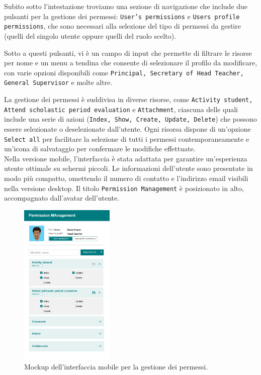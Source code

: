 \documentclass[a4paper, 12pt]{book}
\begin{document}
Subito sotto l'intestazione troviamo una sezione di navigazione che include due pulsanti per la
gestione dei permessi: \texttt{User's permissions} e \texttt{Users profile permissions},
che sono necessari alla selezione del tipo di permessi da gestire (quelli del singolo utente oppure
quelli del ruolo scelto).

Sotto a questi pulsanti, vi è un campo di input che permette di filtrare le risorse per nome e un menu a
tendina che consente di selezionare il profilo da modificare, con varie opzioni disponibili come \texttt{Principal,
  Secretary of Head Teacher, General Supervisor} e molte altre.

La gestione dei permessi è suddivisa in diverse risorse, come \texttt{Activity student, Attend scholastic period evaluation}
e \texttt{Attachment}, ciascuna delle quali include una serie di azioni (\texttt{Index, Show, Create, Update, Delete})
che possono essere selezionate o deselezionate dall'utente. Ogni risorsa dispone di un'opzione
\texttt{Select all} per facilitare la selezione di tutti i permessi contemporaneamente e un'icona di salvataggio
per confermare le modifiche effettuate.\\

Nella versione mobile, l'interfaccia è stata adattata per garantire un'esperienza utente ottimale su
schermi piccoli. Le informazioni dell'utente sono presentate in modo più compatto, omettendo il numero di
contatto e l'indirizzo email visibili nella versione desktop. Il titolo \texttt{Permission Management} è posizionato in alto,
accompagnato dall'avatar dell'utente.

\begin{figure}[H]
  \centering
  \includegraphics[width=0.4\textwidth]{../images/permission-management-mobile-mockup.jpg}
  \caption{Mockup dell'interfaccia mobile per la gestione dei permessi.}
  \label{fig:mobile-mockup}
\end{figure}
\end{document}

